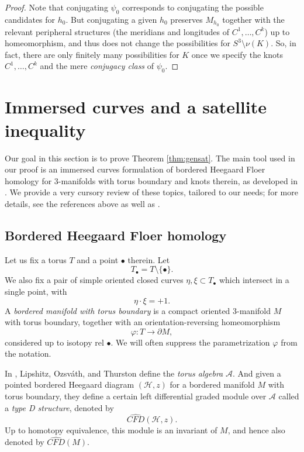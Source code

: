 \documentclass[11pt]{amsart}
\numberwithin{equation}{section}
\numberwithin{theorem}{section}
\theoremstyle{definition}
\newcommand{\CFD}{\widehat{\mathit{CFD}}}
\newcommand{\Alg}{\mathcal{A}}
\begin{document}
\begin{proof}
Note that conjugating $\psi_0$ corresponds to conjugating the possible candidates for $h_0$. But conjugating a given $h_0$ preserves  $M_{h_0}$ together with the relevant peripheral structures (the meridians and longitudes of $C^1,\dots,C^k$) up to homeomorphism, and thus does not change the possibilities for $S^3\setminus \nu(K)$. So, in fact, there are only finitely many possibilities for $K$ once we specify the knots $C^1,\dots, C^k$ and the mere \emph{conjugacy class} of $\psi_0$.
\end{proof}

%
%
%
%
%

\section{Immersed curves and a satellite inequality} \label{sec:satellite-inequality}
Our goal in this section is to prove Theorem \ref{thm:gensat}. The main tool used in our proof is an immersed curves formulation of bordered Heegaard Floer homology for 3-manifolds with torus boundary and knots therein, as developed in \cite{hrw,hrw-properties}. We provide a very cursory review of these topics, tailored to our needs; for more details, see the references above as well as \cite{LOT, LOT-morphism}.

\subsection{Bordered Heegaard Floer homology}
Let us fix a torus $T$ and a point $\bullet$ therein. Let \[T_\bullet = T\setminus \{\bullet\}.\] We also fix a pair of simple oriented closed curves $\eta,\xi\subset T_\bullet$ which intersect in a single point, with \[\eta\cdot\xi = +1.\]A \emph{bordered manifold with torus boundary} is a compact oriented 3-manifold $M$ with torus boundary, together with an orientation-reversing homeomorphism \[\varphi:T\to \partial M,\] considered up to isotopy rel $\bullet$. We will often suppress the parametrization $\varphi$ from the notation.

In \cite{LOT}, Lipshitz, Ozsv{\'a}th, and Thurston define the \emph{torus algebra} $\Alg$. And given a pointed bordered Heegaard diagram $(\mathcal{H},z)$ for a bordered manifold $M$ with torus boundary, they define a certain left differential graded module over $\Alg$ called a \emph{type D structure}, denoted by \[\CFD(\mathcal{H},z).\] Up to homotopy equivalence, this module is an invariant of $M$, and hence also denoted by $\CFD(M)$.
\end{document}
